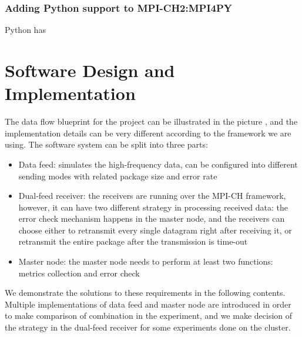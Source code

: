 \documentclass[11pt,openright,a4paper]{report}
\begin{document}
\subsubsection{Adding Python support to MPI-CH2:MPI4PY}
Python has 
\section{Software Design and Implementation}
The data flow blueprint for the project can be illustrated in the picture \cite{fig:LogicDesign}, and the implementation details can be very different according to the framework we are using. The software system can be split into three parts:
\begin{itemize}
	\item Data feed: simulates the high-frequency data, can be configured into different sending modes with related package size and error rate
	\item Dual-feed receiver: the receivers are running over the MPI-CH framework, however, it can have two different strategy in processing received data: the error check mechanism happens in the master node, and the receivers can choose either to retransmit every single datagram right after receiving it, or retransmit the entire package after the transmission is time-out
	\item Master node: the master node needs to perform at least two functions: metrics collection and error check
\end{itemize}
We demonstrate the solutions to these requirements in the following contents. Multiple implementations of data feed and master node are introduced in order to make comparison of combination in the experiment, and we make decision of the strategy in the dual-feed receiver for some experiments done on the cluster. 
\end{document}
